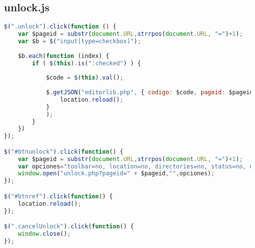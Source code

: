 \subsection{unlock.js}
\begin{lstlisting}[language=Javascript]
$(".unlock").click(function () {
	var $pageid = substr(document.URL,strrpos(document.URL, "=")+1); 
	var $b = $("input[type=checkbox]");
		
	$b.each(function (index) {
		if ( $(this).is(":checked") ) {
			
			$code = $(this).val();
			
			$.getJSON("editorlib.php", { codigo: $code, pageid: $pageid, mode: "3" }, function(json) {
        		location.reload();
       		}
    		);
		}
	})
});

$("#btnunlock").click(function() {
	var $pageid = substr(document.URL,strrpos(document.URL, "=")+1); 
	var opciones="toolbar=no, location=no, directories=no, status=no, menubar=no, scrollbars=no, resizable=yes, width=508, height=365, top=85, left=140";
	window.open("unlock.php?pageid=" + $pageid,"",opciones);
});

$("#btnref").click(function() {
	location.reload();
});

$(".cancelUnlock").click(function() {
	window.close();
});
\end{lstlisting}

